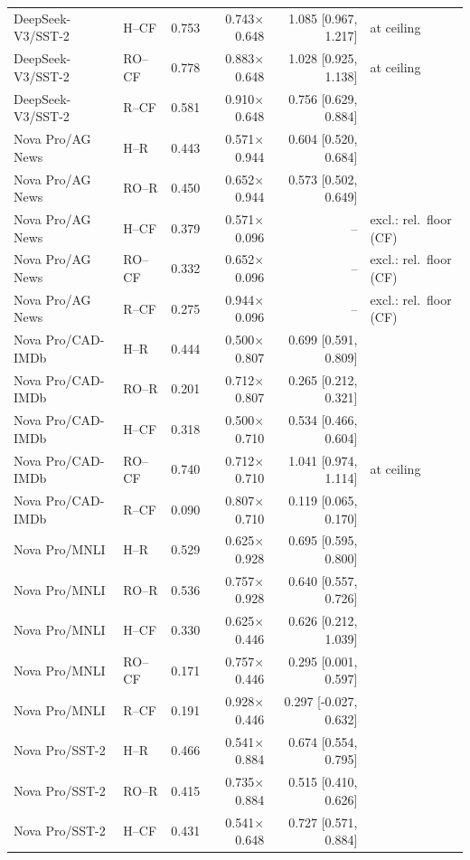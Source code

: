 \begin{table}[t]
\begin{tabular}{llrrrl}
DeepSeek-V3/SST-2 & H--CF & 0.753 & 0.743$\times$0.648 & 1.085 [0.967, 1.217] & at ceiling \\
DeepSeek-V3/SST-2 & RO--CF & 0.778 & 0.883$\times$0.648 & 1.028 [0.925, 1.138] & at ceiling \\
DeepSeek-V3/SST-2 & R--CF & 0.581 & 0.910$\times$0.648 & 0.756 [0.629, 0.884] &  \\
Nova Pro/AG News & H--R & 0.443 & 0.571$\times$0.944 & 0.604 [0.520, 0.684] &  \\
Nova Pro/AG News & RO--R & 0.450 & 0.652$\times$0.944 & 0.573 [0.502, 0.649] &  \\
Nova Pro/AG News & H--CF & 0.379 & 0.571$\times$0.096 & -- & excl.: rel.\ floor (CF) \\
Nova Pro/AG News & RO--CF & 0.332 & 0.652$\times$0.096 & -- & excl.: rel.\ floor (CF) \\
Nova Pro/AG News & R--CF & 0.275 & 0.944$\times$0.096 & -- & excl.: rel.\ floor (CF) \\
Nova Pro/CAD-IMDb & H--R & 0.444 & 0.500$\times$0.807 & 0.699 [0.591, 0.809] &  \\
Nova Pro/CAD-IMDb & RO--R & 0.201 & 0.712$\times$0.807 & 0.265 [0.212, 0.321] &  \\
Nova Pro/CAD-IMDb & H--CF & 0.318 & 0.500$\times$0.710 & 0.534 [0.466, 0.604] &  \\
Nova Pro/CAD-IMDb & RO--CF & 0.740 & 0.712$\times$0.710 & 1.041 [0.974, 1.114] & at ceiling \\
Nova Pro/CAD-IMDb & R--CF & 0.090 & 0.807$\times$0.710 & 0.119 [0.065, 0.170] &  \\
Nova Pro/MNLI & H--R & 0.529 & 0.625$\times$0.928 & 0.695 [0.595, 0.800] &  \\
Nova Pro/MNLI & RO--R & 0.536 & 0.757$\times$0.928 & 0.640 [0.557, 0.726] &  \\
Nova Pro/MNLI & H--CF & 0.330 & 0.625$\times$0.446 & 0.626 [0.212, 1.039] &  \\
Nova Pro/MNLI & RO--CF & 0.171 & 0.757$\times$0.446 & 0.295 [0.001, 0.597] &  \\
Nova Pro/MNLI & R--CF & 0.191 & 0.928$\times$0.446 & 0.297 [-0.027, 0.632] &  \\
Nova Pro/SST-2 & H--R & 0.466 & 0.541$\times$0.884 & 0.674 [0.554, 0.795] &  \\
Nova Pro/SST-2 & RO--R & 0.415 & 0.735$\times$0.884 & 0.515 [0.410, 0.626] &  \\
Nova Pro/SST-2 & H--CF & 0.431 & 0.541$\times$0.648 & 0.727 [0.571, 0.884] &  \\

\end{tabular}
\end{table}

